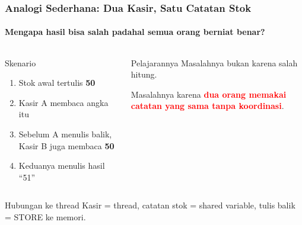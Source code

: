 \documentclass[t,aspectratio=169,xcolor=dvipsnames]{beamer}
\newcommand{\tem}[1]{\textbf{\textcolor{red}{#1}}}
\begin{document}
\begin{frame}
    \frametitle{Analogi Sederhana: Dua Kasir, Satu Catatan Stok}
    \framesubtitle{Mengapa hasil bisa salah padahal semua orang berniat benar?}
    \small

    \begin{columns}[T]
        \begin{block}{Skenario}
            \begin{enumerate}
                \item Stok awal tertulis \textbf{50}
                \item Kasir A membaca angka itu
                \item Sebelum A menulis balik, Kasir B juga membaca \textbf{50}
                \item Keduanya menulis hasil ``51''
            \end{enumerate}
        \end{block}

        \begin{exampleblock}{Pelajarannya}
            Masalahnya bukan karena salah hitung.

            \vspace{0.15cm}
            Masalahnya karena \tem{dua orang memakai catatan yang sama tanpa koordinasi}.
        \end{exampleblock}
    \end{columns}

    \vspace{0.2cm}
    \begin{alertblock}{Hubungan ke thread}
        Kasir = thread, catatan stok = shared variable, tulis balik = STORE ke memori.
    \end{alertblock}
\end{frame}
\end{document}
